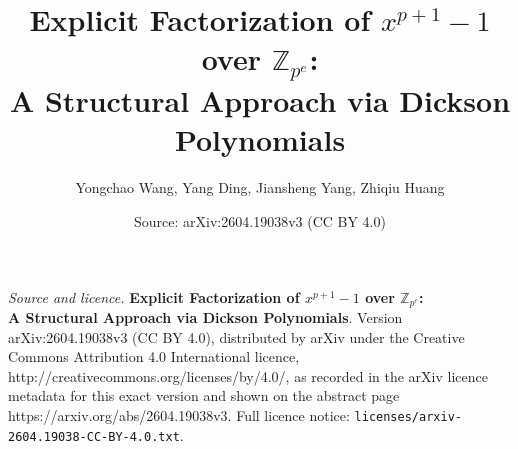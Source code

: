 \documentclass[10pt,a4paper]{amsart}
\title{\textbf{Explicit Factorization of $x^{p+1}-1$ over $\mathbb{Z}_{p^e}$: \\ A Structural Approach via Dickson Polynomials}}
\author{Yongchao Wang, Yang Ding, Jiansheng Yang, Zhiqiu Huang}
\date{Source: arXiv:2604.19038v3 (CC BY 4.0)}
\begin{document}
\maketitle

\noindent\emph{Source and licence.} \textbf{Explicit Factorization of $x^{p+1}-1$ over $\mathbb{Z}_{p^e}$: \\ A Structural Approach via Dickson Polynomials}. Version arXiv:2604.19038v3 (CC BY 4.0), distributed by arXiv under the Creative Commons Attribution 4.0 International licence, http://creativecommons.org/licenses/by/4.0/, as recorded in the arXiv licence metadata for this exact version and shown on the abstract page https://arxiv.org/abs/2604.19038v3. Full licence notice: \texttt{licenses/arxiv-2604.19038-CC-BY-4.0.txt}.\par\smallskip
\end{document}
